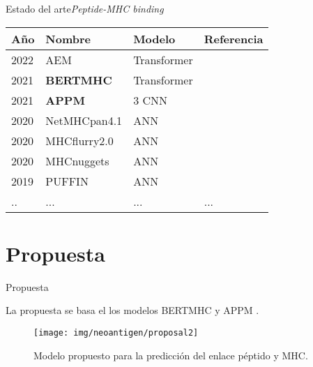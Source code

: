 \documentclass[10pt]{beamer}
\newcommand{\1}{
	\setbeamertemplate{background}{
		\texttt{[image: img/1]}
		\tikz[overlay] \fill[fill opacity=0.75,fill=white] (0,0) rectangle (-\paperwidth,\paperheight);
	}
}
\begin{document}
\begin{frame}{Estado del arte}{\textit{Peptide-MHC binding}}
	\begin{table}[]
		\setlength{\tabcolsep}{0.5em} %
		{\renewcommand{\arraystretch}{1.4}%
			\begin{tabular}{llp{4cm}l}
				\textbf{Año} & \textbf{Nombre} & \textbf{Modelo} & \textbf{Referencia}  \\ \hline
				2022  & AEM  & Transformer   &\cite{hashemi2022improved}   \\
				2021  & \textbf{BERTMHC}  & Transformer   &\cite{cheng2021bertmhc}   \\
				2021  & \textbf{APPM}  & 3 CNN   &\cite{hao2021improvement}   \\
				2020  & NetMHCpan4.1  & ANN   &\cite{reynisson2020netmhcpan}   \\
				2020  & MHCflurry2.0  & ANN   &\cite{o2020mhcflurry}   \\
				2020  & MHCnuggets  & ANN   &\cite{shao2020high}   \\
         	    2019  & PUFFIN  & ANN   &\cite{zeng2019quantification}   \\
         	    ..  & ...  & ...   &...   \\	            
			\end{tabular}
		}
	\end{table}
\end{frame}

\section{Propuesta}



\begin{frame}{Propuesta}{}

		La propuesta se basa el los modelos BERTMHC \cite{cheng2021bertmhc} y APPM \cite{hao2021improvement}.
		


	\vspace{0.5cm}
	\begin{figure}
		\texttt{[image: img/neoantigen/proposal2]}
		\caption{Modelo propuesto para la predicción del enlace péptido y MHC.}
	\end{figure}
\end{frame}
\end{document}
